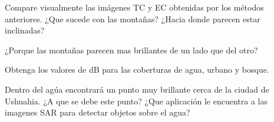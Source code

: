 \begin{que}
    Compare visualmente las imágenes TC y EC obtenidas por los métodos anteriores. ¿Que sucede con las montañas? ¿Hacia donde parecen estar inclinadas?
\end{que}

\begin{que}
    ¿Porque las montañas parecen mas brillantes de un lado que del otro?
\end{que}

\begin{que}
    Obtenga los valores de dB para las coberturas de agua, urbano y bosque.
\end{que}

\begin{que}
    Dentro del agúa encontrará un punto muy brillante cerca de la ciudad de Ushuahia. ¿A que se debe este punto? ¿Que aplicación le encuentra a las imagenes SAR para detectar objetos sobre el agua?
\end{que}
